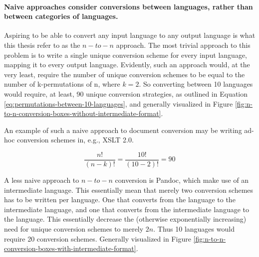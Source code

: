 \documentclass{scrreprt}
\begin{document}
\paragraph{Naive approaches consider conversions between languages, rather than between categories of languages. } Aspiring to be able to convert any input language to any output language is what this thesis refer to as the $n-to-n$ approach. The most trivial approach to this problem is to write a single unique conversion scheme for every input language, mapping it to every output language. Evidently, such an approach would, at the very least, require the number of unique  conversion schemes to be equal to the number of k-permutations of n, where $k=2$. So converting between 10 languages would require, at least, 90 unique conversion strategies, as outlined in Equation \ref{eq:permutations-between-10-languages}, and generally visualized in Figure \ref{fig:n-to-n-conversion-boxes-without-intermediate-format}.

An example of such a naive approach to document conversion may be writing ad-hoc conversion schemes in, e.g., XSLT 2.0.

\begin{equation}
\frac{n!}{(n-k)!} = \frac{10!}{(10-2)!} = 90
\label{eq:permutations-between-10-languages}
\end{equation}

A less naive approach to $n-to-n$ conversion is Pandoc\footnotePandoc{}, which make use of an intermediate language. This essentially mean that merely two conversion schemes has to be written per language. One that converts from the language to the intermediate language, and one that converts from the intermediate language to the language. This essentially decrease the (otherwise exponentially increasing) need for unique conversion schemes to merely $2n$. Thus 10 languages would require 20 conversion schemes. Generally visualized in Figure \ref{fig:n-to-n-conversion-boxes-with-intermediate-format}.
\end{document}
